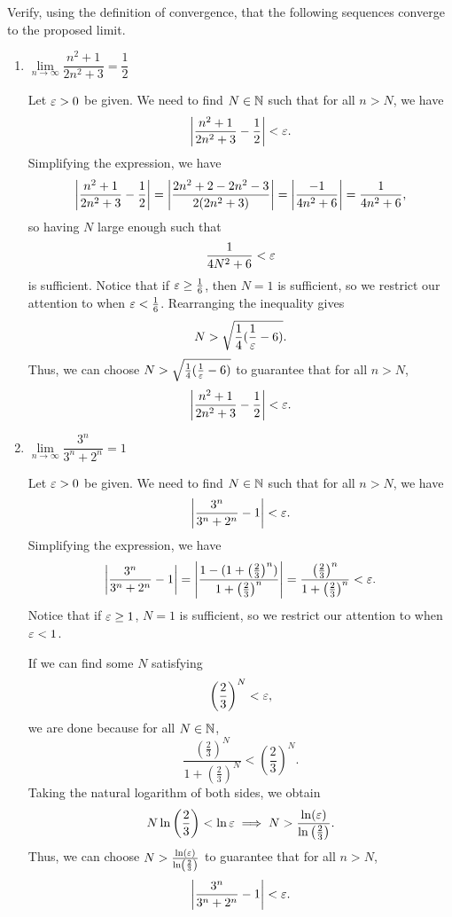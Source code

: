 \begin{problem}
  Verify, using the definition of convergence, that the following sequences converge to the proposed limit.

  \begin{enumerate}[label=(\alph*)]
    \item $\lim\limits_{n \to \infty} \dfrac{n^{2} + 1}{2n^{2} + 3} = \dfrac{1}{2}$

      Let $\varepsilon > 0$ be given. We need to find $N \in \mathbb{N}$ such that for all $n > N$, we have 
      \[
        \left\lvert \frac{n^{2} + 1}{2n^{2} + 3} - \frac{1}{2} \right\rvert < \varepsilon.
      \]
      Simplifying the expression, we have
      \[
        \left\lvert \frac{n^{2} + 1}{2n^{2} + 3} - \frac{1}{2} \right\rvert = \left\lvert \frac{2n^{2} + 2 - 2n^{2} - 3}{2(2n^{2} + 3)} \right\rvert = \left\lvert \frac{-1}{4n^{2} + 6} \right\rvert = \frac{1}{4n^{2} + 6},
      \]
      so having $N$ large enough such that
      \[
        \frac{1}{4N^{2} + 6} < \varepsilon
      \]
      is sufficient. Notice that if $\varepsilon \geq \frac{1}{6}$, then $N = 1$ is sufficient, so we restrict our 
      attention to when $\varepsilon < \frac{1}{6}$. Rearranging the inequality gives 
      \[
        N > \sqrt{\frac{1}{4}(\frac{1}{\varepsilon} - 6)}.
      \]
      Thus, we can choose $N > \sqrt{\frac{1}{4}(\frac{1}{\varepsilon} - 6)}$ to 
      guarantee that for all $n > N$,
      \[
        \left\lvert \frac{n^{2} + 1}{2n^{2} + 3} - \frac{1}{2} \right\rvert < \varepsilon.
      \]

    \item $\lim\limits_{n \to \infty} \dfrac{3^{n}}{3^{n} + 2^{n}} = 1$

      Let $\varepsilon > 0$ be given. We need to find $N \in \mathbb{N}$ such that for all $n > N$, we have 
      \[
        \left\lvert \frac{3^{n}}{3^{n} + 2^{n}} - 1 \right\rvert < \varepsilon.
      \]
      Simplifying the expression, we have
      \[
        \left\lvert \frac{3^{n}}{3^{n} + 2^{n}} - 1 \right\rvert = \left\lvert \frac{1 - (1 + \left( \frac{2}{3} \right)^{n})}{1 + \left( \frac{2}{3} \right)^{n}} \right\rvert = \frac{\left( \frac{2}{3} \right)^{n}}{1 + \left( \frac{2}{3} \right)^{n}} < \varepsilon.
      \]
      Notice that if $\varepsilon \geq 1$, $N = 1$ is sufficient, so we restrict our attention to when $\varepsilon < 1$.
      
      If we can find some $N$ satisfying
      \[
        \left(\frac{2}{3}\right)^{N} < \varepsilon,
      \]
      we are done because for all $N \in \mathbb{N}$,
      \[
        \frac{\left( \frac{2}{3} \right)^{N}}{1 + \left( \frac{2}{3} \right)^{N}} < \left(\frac{2}{3}\right)^{N}.
      \]
      Taking the natural logarithm of both sides, we obtain
      \[ 
        N \ln{ \left( \frac{2}{3} \right) } < \ln{\varepsilon} \implies N > \frac{\ln (\varepsilon)}{\ln \left( \frac{2}{3} \right)}.
      \]
      Thus, we can choose $N > \frac{\ln (\varepsilon)}{\ln \left( \frac{2}{3} \right)}$ to guarantee that for all $n > N$,
      \[
        \left\lvert \frac{3^{n}}{3^{n} + 2^{n}} - 1 \right\rvert < \varepsilon.
      \]


\end{enumerate}
\end{problem}
